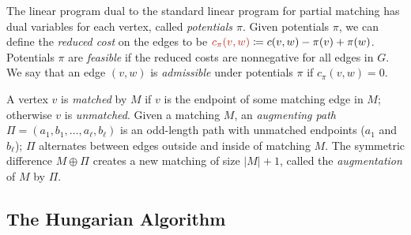 \documentclass[a4paper,UKenglish]{socg-lipics-v2018}
\makeatletter
\def\abs#1{\mathopen| #1 \mathclose|}		%
\def\norm#1{\mathopen\| #1 \mathclose\|}	%
\theoremstyle{plain}
\numberwithin{figure}{section}
\def\EMPH#1{\textcolor{BrickRed}{{\emph{#1}}}}
\def\n@te#1{\textsf{\boldmath \textbf{$\langle\!\langle$#1$\rangle\!\rangle$}}\leavevmode}
\def\note#1{\textcolor{red}{\n@te{#1}}}
\renewcommand{\note}[1]{} %
\makeatother
\begin{document}


The linear program dual to the standard linear program for partial matching has dual variables for
each vertex, called \EMPH{potentials $\pi$}.
Given potentials $\pi$, we can define the \EMPH{reduced cost} on the edges to be
$\EMPH{$c_\pi(v, w)$} \coloneqq c(v, w) - \pi(v) + \pi(w)$.
Potentials $\pi$ are \EMPH{feasible} if the reduced costs are nonnegative for all edges in $G$.
We say that an edge $(v, w)$ is \EMPH{admissible} under potentials $\pi$ if $c_\pi(v, w) = 0$.

A vertex $v$ is \EMPH{matched} by $M$ if $v$ is the endpoint of some matching edge in $M$;
otherwise $v$ is \EMPH{unmatched}.
Given a matching $M$, an \EMPH{augmenting path}
$\Pi = (a_1, b_1, \ldots, a_\ell, b_\ell)$ is an odd-length path with unmatched
endpoints ($a_1$ and $b_\ell$); $\Pi$ alternates between edges outside and inside of matching $M$.
The symmetric difference $M \oplus \Pi$ creates a new matching of size $\abs{M}+1$, called the \EMPH{augmentation} of $M$ by $\Pi$.

\subsection{The Hungarian Algorithm}
\end{document}
